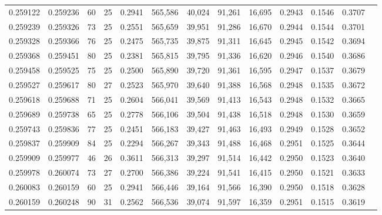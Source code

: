\begin{tabular}{rrrrrrrrrrrrr}
0.259122 & 0.259236 &  60 &  25 &                                     0.2941 & 565,586 &  40,024 &  91,261 &  16,695 & 0.2943 & 0.1546 & 0.3707 \\
0.259239 & 0.259326 &  73 &  25 &                                     0.2551 & 565,659 &  39,951 &  91,286 &  16,670 & 0.2944 & 0.1544 & 0.3701 \\
0.259328 & 0.259366 &  76 &  25 &                                     0.2475 & 565,735 &  39,875 &  91,311 &  16,645 & 0.2945 & 0.1542 & 0.3694 \\
0.259368 & 0.259451 &  80 &  25 &                                     0.2381 & 565,815 &  39,795 &  91,336 &  16,620 & 0.2946 & 0.1540 & 0.3686 \\
0.259458 & 0.259525 &  75 &  25 &                                     0.2500 & 565,890 &  39,720 &  91,361 &  16,595 & 0.2947 & 0.1537 & 0.3679 \\
0.259527 & 0.259617 &  80 &  27 &                                     0.2523 & 565,970 &  39,640 &  91,388 &  16,568 & 0.2948 & 0.1535 & 0.3672 \\
0.259618 & 0.259688 &  71 &  25 &                                     0.2604 & 566,041 &  39,569 &  91,413 &  16,543 & 0.2948 & 0.1532 & 0.3665 \\
0.259689 & 0.259738 &  65 &  25 &                                     0.2778 & 566,106 &  39,504 &  91,438 &  16,518 & 0.2948 & 0.1530 & 0.3659 \\
0.259743 & 0.259836 &  77 &  25 &                                     0.2451 & 566,183 &  39,427 &  91,463 &  16,493 & 0.2949 & 0.1528 & 0.3652 \\
0.259837 & 0.259909 &  84 &  25 &                                     0.2294 & 566,267 &  39,343 &  91,488 &  16,468 & 0.2951 & 0.1525 & 0.3644 \\
0.259909 & 0.259977 &  46 &  26 &                                     0.3611 & 566,313 &  39,297 &  91,514 &  16,442 & 0.2950 & 0.1523 & 0.3640 \\
0.259978 & 0.260074 &  73 &  27 &                                     0.2700 & 566,386 &  39,224 &  91,541 &  16,415 & 0.2950 & 0.1521 & 0.3633 \\
0.260083 & 0.260159 &  60 &  25 &                                     0.2941 & 566,446 &  39,164 &  91,566 &  16,390 & 0.2950 & 0.1518 & 0.3628 \\
0.260159 & 0.260248 &  90 &  31 &                                     0.2562 & 566,536 &  39,074 &  91,597 &  16,359 & 0.2951 & 0.1515 & 0.3619 \\

\end{tabular}
